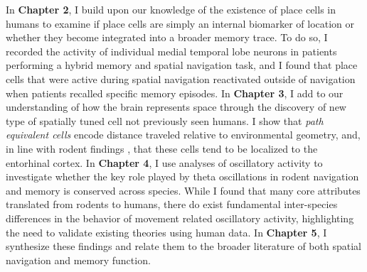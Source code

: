 In \textbf{Chapter 2}, I build upon our knowledge of the existence of place cells in humans to examine if place cells are simply an internal biomarker of location or whether they become integrated into a broader memory trace. To do so, I recorded the activity of individual medial temporal lobe neurons in patients performing a hybrid memory and spatial navigation task, and I found that place cells that were active during spatial navigation reactivated outside of navigation when patients recalled specific memory episodes. In \textbf{Chapter 3}, I add to our understanding of how the brain represents space through the discovery of new type of spatially tuned cell not previously seen humans. I show that \textit{path equivalent cells} encode distance traveled relative to environmental geometry, and, in line with rodent findings \citep{FranEtal00}, that these cells tend to be localized to the entorhinal cortex. In \textbf{Chapter 4}, I use analyses of oscillatory activity to investigate whether the key role played by theta oscillations in rodent navigation and memory is conserved across species. While I found that many core attributes translated from rodents to humans, there do exist fundamental inter-species differences in the behavior of movement related oscillatory activity, highlighting the need to validate existing theories using human data. In \textbf{Chapter 5}, I synthesize these findings and relate them to the broader literature of both spatial navigation and memory function.

% 

